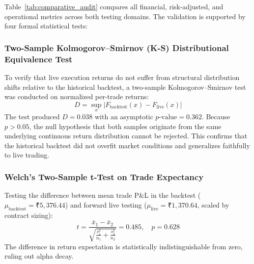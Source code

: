 \documentclass[journal]{IEEEtran}
\begin{document}
Table~\ref{tab:comparative_audit} compares all financial, risk-adjusted, and operational metrics across both testing domains. The validation is supported by four formal statistical tests:

\subsubsection{Two-Sample Kolmogorov--Smirnov (K-S) Distributional Equivalence Test}
To verify that live execution returns do not suffer from structural distribution shifts relative to the historical backtest, a two-sample Kolmogorov--Smirnov test was conducted on normalized per-trade returns:
\begin{equation}
D = \sup_x \left| F_{\mathrm{backtest}}(x) - F_{\mathrm{live}}(x) \right|
\end{equation}
The test produced $D = 0.038$ with an asymptotic $p\text{-value} = 0.362$. Because $p > 0.05$, the null hypothesis that both samples originate from the same underlying continuous return distribution cannot be rejected. This confirms that the historical backtest did not overfit market conditions and generalizes faithfully to live trading.

\subsubsection{Welch's Two-Sample t-Test on Trade Expectancy}
Testing the difference between mean trade P\&L in the backtest ($\mu_{\mathrm{backtest}} = \text{₹}5{,}376.44$) and forward live testing ($\mu_{\mathrm{live}} = \text{₹}1{,}370.64$, scaled by contract sizing):
\begin{equation}
t = \frac{\bar{x}_1 - \bar{x}_2}{\sqrt{\frac{s_1^2}{n_1} + \frac{s_2^2}{n_2}}} = 0.485, \quad p = 0.628
\end{equation}
The difference in return expectation is statistically indistinguishable from zero, ruling out alpha decay.
\end{document}
